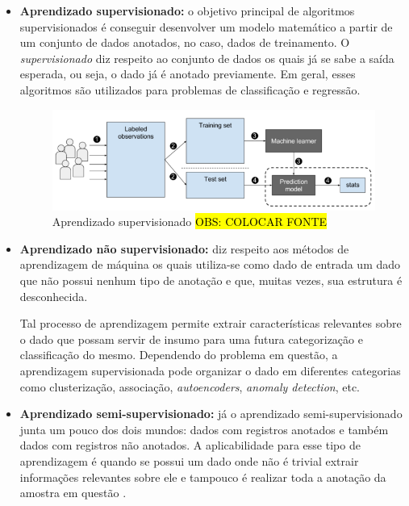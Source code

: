\begin{itemize}
  \item \textbf{Aprendizado supervisionado:} o objetivo principal de algoritmos supervisionados é conseguir desenvolver um modelo matemático a partir de um conjunto de dados anotados, no caso, dados de treinamento. O \textit{supervisionado} diz respeito ao conjunto de dados os quais já se sabe a saída esperada, ou seja, o dado já é anotado previamente. Em geral, esses algoritmos são utilizados para problemas de classificação e regressão.


  \begin{figure}
    \includegraphics[width=\linewidth]{figuras/nvidia-supervised-learning.png}
    \caption{Aprendizado supervisionado \hl{OBS: COLOCAR FONTE}}
    \label{fig:nvidia-supervised-learning}
  \end{figure}
  \newpage
  \item \textbf{Aprendizado não supervisionado:} diz respeito aos métodos de aprendizagem de máquina os quais utiliza-se como dado de entrada um dado que não possui nenhum tipo de anotação e que, muitas vezes, sua estrutura é desconhecida.

  Tal processo de aprendizagem permite extrair características relevantes sobre o dado que possam servir de insumo para uma futura categorização e classificação do mesmo. Dependendo do problema em questão, a aprendizagem supervisionada pode organizar o dado em diferentes categorias \cite{learning-types} como clusterização, associação, \textit{autoencoders}, \textit{anomaly detection}, etc.

  \item \textbf{Aprendizado semi-supervisionado:} já o aprendizado semi-supervisionado junta um pouco dos dois mundos: dados com registros anotados e também dados com registros não anotados. A aplicabilidade para esse tipo de aprendizagem é quando se possui um dado onde não é trivial extrair informações relevantes sobre ele e tampouco é realizar toda a anotação da amostra em questão \cite{learning-types}.
\end{itemize}

